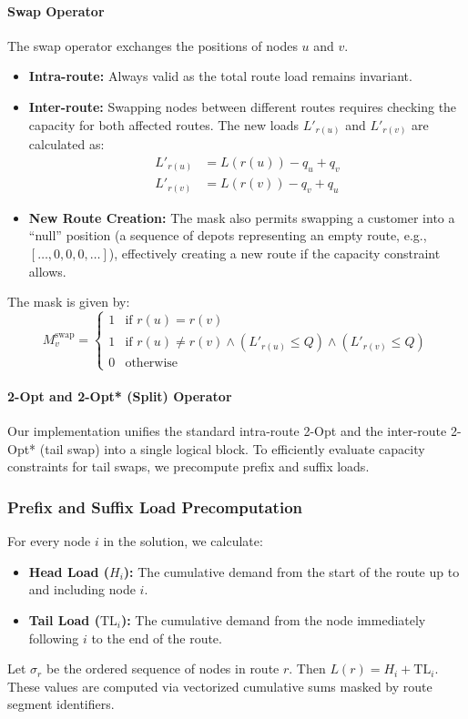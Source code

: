 \documentclass[letterpaper]{article} %
\begin{document}
\paragraph{Swap Operator}
The swap operator exchanges the positions of nodes $u$ and $v$.
\begin{itemize}
    \item \textbf{Intra-route:} Always valid as the total route load remains invariant.
    \item \textbf{Inter-route:} Swapping nodes between different routes requires checking the capacity for both affected routes. The new loads $L'_{r(u)}$ and $L'_{r(v)}$ are calculated as:
    \begin{align}
        L'_{r(u)} &= L(r(u)) - q_u + q_v \\
        L'_{r(v)} &= L(r(v)) - q_v + q_u
    \end{align}
    \item \textbf{New Route Creation:} The mask also permits swapping a customer into a ``null'' position (a sequence of depots representing an empty route, e.g., $[\dots, 0, 0, 0, \dots]$), effectively creating a new route if the capacity constraint allows.
\end{itemize}
The mask is given by:
\begin{equation}
    M_v^{\text{swap}} =
    \begin{cases}
        1 & \text{if } r(u) = r(v) \\
        1 & \text{if } r(u) \neq r(v) \land (L'_{r(u)} \leq Q) \land (L'_{r(v)} \leq Q) \\
        0 & \text{otherwise}
    \end{cases}
\end{equation}

\paragraph{2-Opt and 2-Opt* (Split) Operator}
Our implementation unifies the standard intra-route 2-Opt and the inter-route 2-Opt* (tail swap) into a single logical block. To efficiently evaluate capacity constraints for tail swaps, we precompute prefix and suffix loads.

\subsubsection{Prefix and Suffix Load Precomputation}
For every node $i$ in the solution, we calculate:
\begin{itemize}
    \item \textbf{Head Load ($H_i$):} The cumulative demand from the start of the route up to and including node $i$.
    \item \textbf{Tail Load ($\mathrm{TL}_i$):} The cumulative demand from the node immediately following $i$ to the end of the route.
\end{itemize}
Let $\sigma_r$ be the ordered sequence of nodes in route $r$. Then $L(r) = H_i + \mathrm{TL}_i$. These values are computed via vectorized cumulative sums masked by route segment identifiers.
\end{document}
